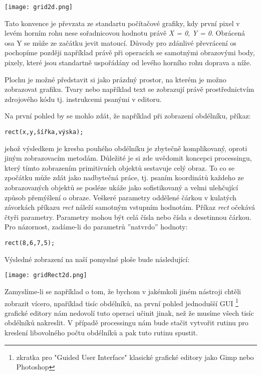 \documentclass[11pt]{article} %
\begin{document}
\begin{center}
\texttt{[image: grid2d.png]}
\end{center}

Tato konvence je převzata ze standartu počítačové grafiky, kdy první pixel v levém horním rohu nese sořadnicovou hodnotu právě {\em X = 0}, {\em Y = 0}. Obrácená osa Y se může ze začátku jevit matoucí. Důvody pro zdánlivé převrácení os pochopíme později například právě při operacích se samotnými obrazovými body, pixely, které jsou standartně uspořádány od levého horního rohu doprava a níže.

Plochu je možné představit si jako prázdný prostor, na kterém je možno zobrazovat grafiku. Tvary nebo například text se zobrazují právě prostřednictvím zdrojového kódu tj. instrukcemi psanými v editoru.

Na první pohled by se mohlo zdát, že například při zobrazení obdélníku, příkaz:

\begin{verbatim}
rect(x,y,šířka,výska);
\end{verbatim}

jehož výsledkem je kresba pouhého obdélníku je zbytečně komplikovaný, oproti jiným zobrazovacím metodám. Důležité je si zde uvědomit koncepci processingu, který tímto zobrazením primitivních objektů sestavuje celý obraz. To co se zpočátku může zdát jako nadbytečná práce, tj. psaním koordinátů každeho ze zobrazovaných objektů se posléze ukáže jako sofistikovaný a velmi ulehčující způsob přemýšlení o obraze. Veškeré parametry oddělené čárkou v kulatých závorkách příkazu {\em rect} náleží samotným vstupním hodnotám. Příkaz {\em rect} očekává čtyři parametry. Parametry mohou být celá čísla nebo čísla s desetinnou čárkou. Pro názornost, zadáme-li do parametrů ''natvrdo'' hodnoty:

\begin{verbatim}
rect(8,6,7,5);
\end{verbatim}

Výsledné zobrazení na naší pomyslné ploše bude následující:

\begin{center}
\texttt{[image: gridRect2d.png]}
\end{center}


Zamyslíme-li se například o tom, že bychom v jakémkoli jiném nástroji chtěli zobrazit vícero, npaříklad tisíc obdélníků, na první pohled jednodušší GUI \footnote{zkratka pro "Guided User Interface" klasické grafické editory jako Gimp nebo Photoshop} grafické editory nám nedovolí tuto operaci učinit jinak, než že musíme všech tisíc obdélníků nakreslit. V případě processingu nám bude stačit vytvořit rutinu pro kreslení libovolného počtu obdélníků a pak tuto rutinu spustit.
\end{document}
